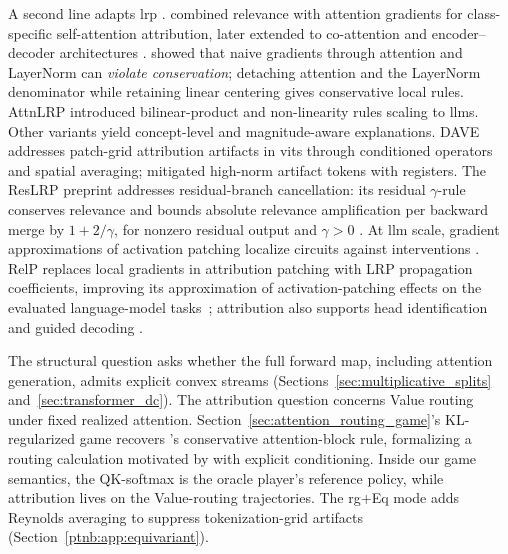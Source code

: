 A second line adapts \ac{lrp} \parencite{Bach2015}. \textcite{Chefer2021GenericAttention} combined relevance with attention gradients for class-specific self-attention attribution, later extended to co-attention and encoder--decoder architectures \parencite{Chefer2021ICCV}. \textcite{Ali2022AttnLRP} showed that naive gradients through attention and LayerNorm can \emph{violate conservation}; detaching attention and the LayerNorm denominator while retaining linear centering gives conservative local rules. AttnLRP \parencite{Achtibat2024AttnLRP} introduced bilinear-product and non-linearity rules scaling to \acp{llm}. Other variants yield concept-level \parencite{Achtibat2023CRP} and magnitude-aware \parencite{vukadin2024abslrp} explanations. DAVE \parencite{Wrobel2024} addresses patch-grid attribution artifacts in \acp{vit} \parencite{Dosovitskiy2021vit} through conditioned operators and spatial averaging; \textcite{darcet2024vision} mitigated high-norm artifact tokens with registers. The ResLRP preprint addresses residual-branch cancellation: its residual $\gamma$-rule conserves relevance and bounds absolute relevance amplification per backward merge by $1+2/\gamma$, for nonzero residual output and $\gamma>0$ \parencite{Berend2026ResLRP}. At \ac{llm} scale, gradient approximations of activation patching \parencite{Syed2024AttributionPatching,Kramar2024AtPStar} localize circuits against interventions \parencite{Hanna2024Faithfulness}. RelP replaces local gradients in attribution patching with LRP propagation coefficients, improving its approximation of activation-patching effects on the evaluated language-model tasks~\parencite{Jafari2025RelP}; attribution also supports head identification and guided decoding \parencite{Kahardipraja2025Atlas,Komorowski2026AGD}.

The structural question asks whether the full forward map, including attention generation, admits explicit convex streams (Sections~\ref{sec:multiplicative_splits} and~\ref{sec:transformer_dc}). The attribution question concerns Value routing under fixed realized attention. Section~\ref{sec:attention_routing_game}'s KL-regularized game recovers \textcite{Ali2022AttnLRP}'s conservative attention-block rule, formalizing a routing calculation motivated by \textcite{Abnar2020attention} with explicit conditioning. Inside our game semantics, the QK-softmax is the oracle player's reference policy, while attribution lives on the Value-routing trajectories. The \ac{rg}+Eq mode adds Reynolds averaging to suppress tokenization-grid artifacts (Section~\ref{ptnb:app:equivariant}).

